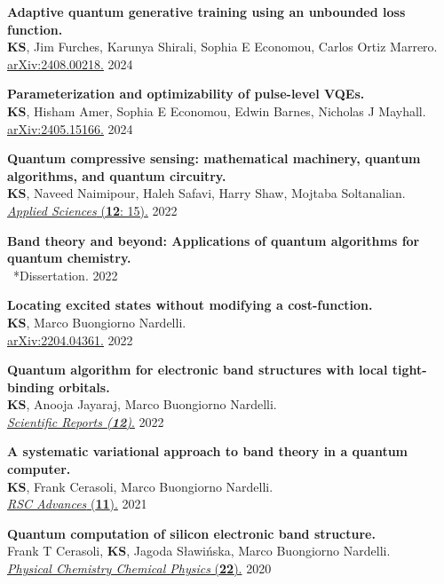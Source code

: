 \documentclass[marginmode, 10pt]{res} %
\newcommand{\me}{\textbf{KS}}       %
\begin{document}
\begin{resume}
\textbf{Adaptive quantum generative training using an unbounded loss function.} \\
    \me, Jim Furches, Karunya Shirali, Sophia E Economou, Carlos Ortiz Marrero. \\
    \href{https://arxiv.org/abs/2408.00218}{arXiv:2408.00218.} \hfill 2024

\textbf{Parameterization and optimizability of pulse-level VQEs.} \\
    \me, Hisham Amer, Sophia E Economou, Edwin Barnes, Nicholas J Mayhall. \\
    \href{https://arxiv.org/abs/2405.15166}{arXiv:2405.15166.} \hfill 2024

\textbf{Quantum compressive sensing: mathematical machinery, quantum algorithms, and quantum circuitry.} \\
    \me, Naveed Naimipour, Haleh Safavi, Harry Shaw, Mojtaba Soltanalian. \\
    \href{https://doi.org/10.3390/app12157525}{\textit{Applied Sciences} (\textbf{12}: 15).} \hfill 2022

\textbf{Band theory and beyond: Applications of quantum algorithms for quantum chemistry.} \\
    ~*Dissertation. \hfill 2022

\textbf{Locating excited states without modifying a cost-function.} \\
    \me, Marco Buongiorno Nardelli. \\
    \href{https://arxiv.org/abs/2204.04361}{arXiv:2204.04361.} \hfill 2022

\textbf{Quantum algorithm for electronic band structures with local tight-binding orbitals.} \\
    \me, Anooja Jayaraj, Marco Buongiorno Nardelli. \\
    \href{https://doi.org/10.1038/s41598-022-13627-x}{\textit{Scientific Reports (\textbf{12})}.} \hfill 2022

\textbf{A systematic variational approach to band theory in a quantum computer.} \\
    \me, Frank Cerasoli, Marco Buongiorno Nardelli. \\
    \href{https://doi.org/10.1039/D1RA07451B}{\textit{RSC Advances} (\textbf{11}).} \hfill 2021

\textbf{Quantum computation of silicon electronic band structure.} \\
    Frank T Cerasoli, \me, Jagoda S\l{}awi\'nska, Marco Buongiorno Nardelli. \\
    \href{https://arxiv.org/abs/2006.03807}{\textit{Physical Chemistry Chemical Physics} (\textbf{22}).} \hfill 2020


\end{resume}
\end{document}
